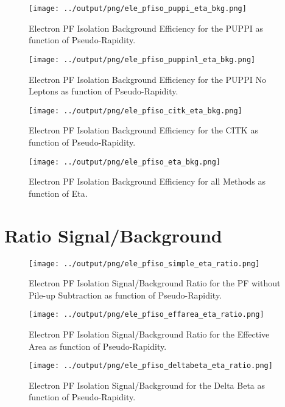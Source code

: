 \documentclass[11pt]{book}
\begin{document}
\begin{figure}[htb]
\centering
\texttt{[image: ../output/png/ele\_pfiso\_puppi\_eta\_bkg.png]}
\caption{Electron PF Isolation Background Efficiency for the PUPPI as function of Pseudo-Rapidity.}
\label{fig:ele_pfiso_eta_bkg_puppi}
\end{figure}

\begin{figure}[htb]
\centering
\texttt{[image: ../output/png/ele\_pfiso\_puppinl\_eta\_bkg.png]}
\caption{Electron PF Isolation Background Efficiency for the PUPPI No Leptons as function of Pseudo-Rapidity.}
\label{fig:ele_pfiso_eta_bkg_puppinl}
\end{figure}

\begin{figure}[htb]
\centering
\texttt{[image: ../output/png/ele\_pfiso\_citk\_eta\_bkg.png]}
\caption{Electron PF Isolation Background Efficiency for the CITK as function of Pseudo-Rapidity.}
\label{fig:ele_pfiso_eta_bkg_citk}
\end{figure}

\begin{figure}[htb]
\centering
\texttt{[image: ../output/png/ele\_pfiso\_eta\_bkg.png]}
\caption{Electron PF Isolation Background Efficiency for all Methods as function of Eta.}
\label{fig:ele_pfiso_eta_bkg}
\end{figure}
\clearpage

\chapter{Ratio Signal/Background}
\begin{figure}[htb]
\centering
\texttt{[image: ../output/png/ele\_pfiso\_simple\_eta\_ratio.png]}
\caption{Electron PF Isolation Signal/Background Ratio for the PF without Pile-up Subtraction as function of Pseudo-Rapidity.}
\label{fig:ele_pfiso_eta_ratio_simple}
\end{figure}


\begin{figure}[htb]
\centering
\texttt{[image: ../output/png/ele\_pfiso\_effarea\_eta\_ratio.png]}
\caption{Electron PF Isolation Signal/Background Ratio for the Effective Area as function of Pseudo-Rapidity.}
\label{fig:ele_pfiso_eta_ratio_effarea}
\end{figure}

\begin{figure}[htb]
\centering
\texttt{[image: ../output/png/ele\_pfiso\_deltabeta\_eta\_ratio.png]}
\caption{Electron PF Isolation Signal/Background for the Delta Beta as function of Pseudo-Rapidity.}
\label{fig:ele_pfiso_eta_ratio_deltabeta}
\end{figure}
\end{document}
